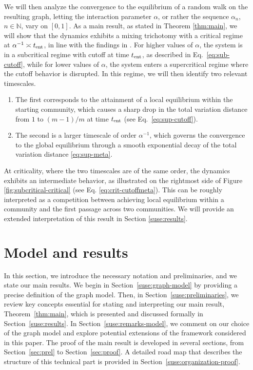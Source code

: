 \documentclass[11pt,oneside]{amsart}
\numberwithin{equation}{section}  %
\theoremstyle{plain}
\newcommand{\tent}{t_{\textup{ent}}}
\begin{document}
We will then analyze the convergence to the equilibrium
of a random walk on the resulting graph, letting
the interaction parameter $\alpha$, or rather the sequence $\alpha_n$, $n \in \mathbb{N}$, vary on $[0,1]$.
As a main result, as stated in Theorem \ref{thm:main}, we will show that
the dynamics exhibits a mixing trichotomy with a critical regime at $\alpha^{-1} \asymp \tent$, in line with the findings in \cite{Ben-Hamou,HSS}. 
For higher values of $\alpha$, the system is in a subcritical regime with cutoff at time $\tent$, as described in Eq.~\eqref{eq:sub-cutoff}, while for lower values of $\alpha$, 
the system enters a supercritical regime where the cutoff behavior is disrupted.  
In this regime, we will then identify two relevant timescales.  
\begin{enumerate} 
\item[(i)] 
The first corresponds to the attainment of a local equilibrium within the starting community, which causes a sharp drop in the total variation distance from $1$ to $(m - 1)/m$ at time $\tent$ (see Eq.~\eqref{eq:sup-cutoff}).  
\item[(ii)] The second is a larger timescale of order $\alpha^{-1}$, which governs the convergence to the global equilibrium through a smooth exponential decay of the total variation distance \eqref{eq:sup-meta}.  
\end{enumerate}
%
At criticality, where the two timescales are of the same order, 
the dynamics exhibits an intermediate behavior, 
as illustrated on the rightmost side of Figure \ref{fig:subcritical-critical} (see Eq. \eqref{eq:crit-cutoffmeta}).
This can be roughly interpreted as a competition between achieving local equilibrium within a community
and the first passage across two communities. We will provide an extended interpretation of this result in Section \ref{suse:results}.

\section{Model and results} \label{sec:model}
In this section, we introduce the necessary notation and preliminaries, 
and we state our main results. 
We begin in Section~\ref{suse:graph-model} by providing a precise definition
of the graph model. Then, in Section~\ref{suse:preliminaries}, we review
key concepts essential for stating and interpreting our main result, Theorem~\ref{thm:main}, which is presented and discussed formally in Section~\ref{suse:results}. 
In Section~\ref{suse:remarks-model}, we comment on our choice of the graph model and explore potential extensions of the framework considered in this paper. The proof of the main result is developed in several sections, from Section~\ref{sec:prel} to Section~\ref{sec:proof}. A detailed road map that describes the structure of this technical part is provided in Section~\ref{suse:organization-proof}.
\end{document}
